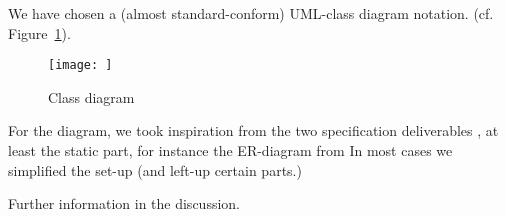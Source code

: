 





We have chosen a (almost standard-conform) UML-class diagram notation.
(cf. Figure~\ref{fig:classdiagram}).


\begin{figure}[htbp]
  \centering
  \texttt{[image: ]}
  \caption{Class diagram}
  \label{fig:classdiagram}
\end{figure}

For the diagram, we took inspiration from the two specification
deliverables \cite{coma:spec1} \cite{coma:spec2}, at least the static part,
for instance the ER-diagram from \cite{coma:spec1} In most cases we
simplified the set-up (and left-up certain parts.)


Further information in the discussion.






%


%

